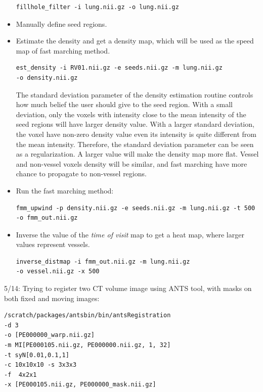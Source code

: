 \documentclass[12pt]{article}
\begin{document}
\begin{itemize}
\begin{Verbatim}[frame=single]
fillhole_filter -i lung.nii.gz -o lung.nii.gz
\end{Verbatim}

\item Manually define seed regions.

\item Estimate the density and get a density map, which will be used as the
  speed map of fast marching method. 
\begin{Verbatim}[frame=single]
est_density -i RV01.nii.gz -e seeds.nii.gz -m lung.nii.gz 
-o density.nii.gz
\end{Verbatim}
  The standard deviation parameter of the density estimation routine controls
  how much belief the user should give to the seed region. With a small
  deviation, only the voxels with intensity close to the mean intensity of the
  seed regions will have larger density value. With a larger standard
  deviation, the voxel have non-zero density value even its intensity is quite
  different from the mean intensity. Therefore, the standard deviation
  parameter can be seen as a regularization. A larger value will make the
  density map more flat. Vessel and non-vessel voxels density will be similar,
  and fast marching have more chance to propagate to non-vessel regions.

  \item Run the fast marching method:
\begin{Verbatim}[frame=single]
fmm_upwind -p density.nii.gz -e seeds.nii.gz -m lung.nii.gz -t 500 
-o fmm_out.nii.gz
\end{Verbatim}

\item Inverse the value of the \emph{time of visit} map to get a heat map,
  where larger values represent vessels. 
\begin{Verbatim}[frame=single]
inverse_distmap -i fmm_out.nii.gz -m lung.nii.gz 
-o vessel.nii.gz -x 500
\end{Verbatim}
\end{itemize}

5/14: Trying to register two CT volume image using ANTS tool, with masks on
both fixed and moving images: 
\begin{Verbatim}[frame=single]
/scratch/packages/antsbin/bin/antsRegistration 
-d 3 
-o [PE000000_warp.nii.gz] 
-m MI[PE000105.nii.gz, PE000000.nii.gz, 1, 32] 
-t syN[0.01,0.1,1] 
-c 10x10x10 -s 3x3x3 
-f  4x2x1 
-x [PE000105.nii.gz, PE000000_mask.nii.gz]
\end{Verbatim}
\end{document}
